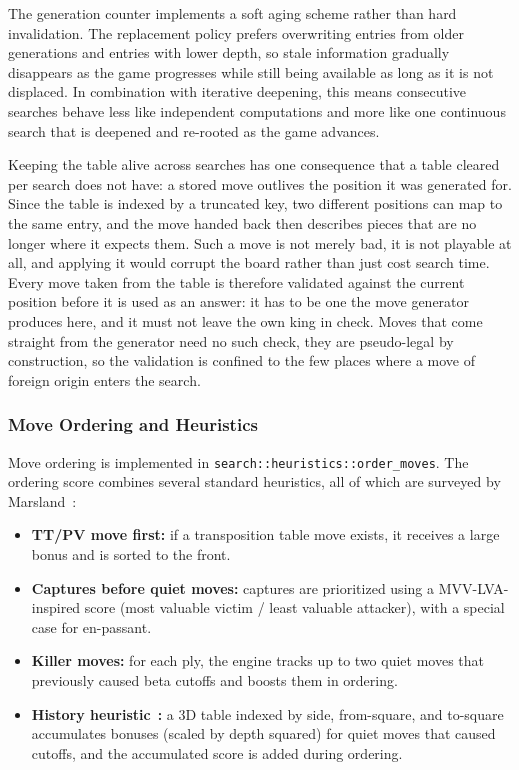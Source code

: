 The generation counter implements a soft aging scheme rather than hard
invalidation. The replacement policy prefers overwriting entries from older
generations and entries with lower depth, so stale information gradually
disappears as the game progresses while still being available as long as it is
not displaced. In combination with iterative deepening, this means consecutive
searches behave less like independent computations and more like one continuous
search that is deepened and re-rooted as the game advances.

Keeping the table alive across searches has one consequence that a table cleared
per search does not have: a stored move outlives the position it was generated
for. Since the table is indexed by a truncated key, two different positions can
map to the same entry, and the move handed back then describes pieces that are no
longer where it expects them. Such a move is not merely bad, it is not playable at
all, and applying it would corrupt the board rather than just cost search time.
Every move taken from the table is therefore validated against the current
position before it is used as an answer: it has to be one the move generator
produces here, and it must not leave the own king in check. Moves that come
straight from the generator need no such check, they are pseudo-legal by
construction, so the validation is confined to the few places where a move of
foreign origin enters the search.

\subsubsection{Move Ordering and Heuristics}
\label{subsec:move_ordering}

Move ordering is implemented in \texttt{search::heuristics::\allowbreak order\_moves}.
The ordering score combines several standard heuristics, all of which are
surveyed by Marsland~\cite{marsland1986review}:
\begin{itemize}
    \item \textbf{TT/PV move first:} if a transposition table move exists, it
    receives a large bonus and is sorted to the front.
    \item \textbf{Captures before quiet moves:} captures are prioritized using a
    MVV-LVA-inspired score (most valuable victim / least valuable attacker),
    with a special case for en-passant.
    \item \textbf{Killer moves:} for each ply, the engine tracks up to two quiet
    moves that previously caused beta cutoffs and boosts them in ordering.
    \item \textbf{History heuristic}~\cite{schaeffer1989history}\textbf{:} a 3D
    table indexed by side, from-square, and to-square accumulates bonuses (scaled
    by depth squared) for quiet moves that caused cutoffs, and the accumulated
    score is added during ordering.
\end{itemize}

